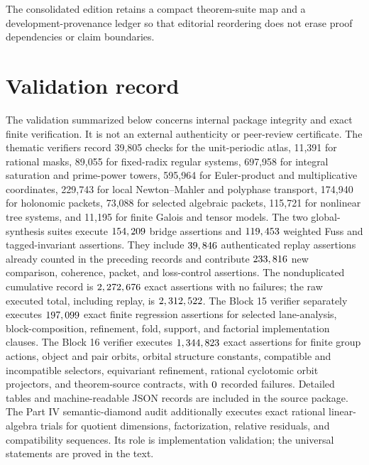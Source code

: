 \documentclass[11pt]{article}
\theoremstyle{definition}
\theoremstyle{remark}
\begin{document}
The consolidated edition retains a compact theorem-suite map and a development-provenance ledger so that editorial reordering does not erase proof dependencies or claim boundaries.








\clearpage


\clearpage


\clearpage
\section{Validation record}

The validation summarized below concerns internal package integrity and exact finite verification. It is not an external authenticity or peer-review certificate. The thematic verifiers record 39,805 checks for the unit-periodic atlas, 11,391 for rational masks, 89,055 for fixed-radix regular systems, 697,958 for integral saturation and prime-power towers, 595,964 for Euler-product and multiplicative coordinates, 229,743 for local Newton--Mahler and polyphase transport, 174,940 for holonomic packets, 73,088 for selected algebraic packets, 115,721 for nonlinear tree systems, and 11,195 for finite Galois and tensor models. The two global-synthesis suites execute \(154,209\) bridge assertions and \(119,453\) weighted Fuss and tagged-invariant assertions. They include \(39,846\) authenticated replay assertions already counted in the preceding records and contribute \(233,816\) new comparison, coherence, packet, and loss-control assertions. The nonduplicated cumulative record is \(2,272,676\) exact assertions with no failures; the raw executed total, including replay, is \(2,312,522\). The Block 15 verifier separately executes \(197,099\) exact finite regression assertions for selected lane-analysis, block-composition, refinement, fold, support, and factorial implementation clauses. The Block 16 verifier executes \(1,344,823\) exact assertions for finite group actions, object and pair orbits, orbital structure constants, compatible and incompatible selectors, equivariant refinement, rational cyclotomic orbit projectors, and theorem-source contracts, with \(0\) recorded failures. Detailed tables and machine-readable JSON records are included in the source package. The Part IV semantic-diamond audit additionally executes exact rational linear-algebra trials for quotient dimensions, factorization, relative residuals, and compatibility sequences. Its role is implementation validation; the universal statements are proved in the text.
\end{document}
